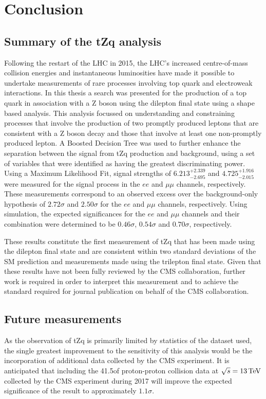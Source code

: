 \chapter{Conclusion}\label{chapter:conclusion}
\section{Summary of the tZq analysis}
Following the restart of the LHC in 2015, the LHC's increased centre-of-mass collision energies and instantaneous luminosities have made it possible to undertake measurements of rare processes involving top quark and electroweak interactions.
In this thesis a search was presented for the production of a top quark in association with a Z boson using the dilepton final state using a shape based analysis.
This analysis focussed on understanding and constraining processes that involve the production of two promptly produced leptons that are consistent with a Z boson decay and those that involve at least one non-promptly produced lepton.
A Boosted Decision Tree was used to further enhance the separation between the signal from tZq production and background, using a set of variables that were identified as having the greatest discriminating power.
Using a Maximum Likelihood Fit, signal strengths of $6.213_{-2.695}^{+2.339}$ and $4.725_{-2.015}^{+1.916}$ were measured for the signal process in the $ee$ and $\mu\mu$ channels, respectively.
These measurements correspond to an observed excess over the background-only hypothesis of $2.72\sigma$ and $2.50\sigma$ for the $ee$ and $\mu\mu$ channels, respectively.
Using simulation, the expected significances for the $ee$ and $\mu\mu$ channels and their combination were determined to be $0.46\sigma$, $0.54\sigma$ and $0.70\sigma$, respectively.

These results constitute the first measurement of tZq that has been made using the dilepton final state and are consistent within two standard deviations of the SM prediction and measurements made using the trilepton final state.
Given that these results have not been fully reviewed by the CMS collaboration, further work is required in order to interpret this measurement and to achieve the standard required for journal publication on behalf of the CMS collaboration.

\section{Future measurements}
As the observation of tZq is primarily limited by statistics of the dataset used, the single greatest improvement to the sensitivity of this analysis would be the incorporation of additional data collected by the CMS experiment.
It is anticipated that including the 41.5\fbinv of proton-proton collision data at $\sqrt{s} = 13\,\text{Te\hspace{-.08em}V}$ collected by the CMS experiment during 2017 will improve the expected significance of the result to approximately $1.1\sigma$.

